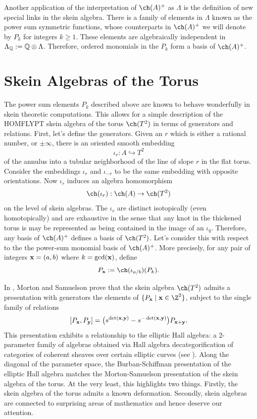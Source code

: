 Another application of the interpretation of $\ch(A)^+$ as $\Lambda$ is the definition of new special links in the skein algebra. There is a family of elements in $\Lambda$ known as the power sum symmetric functions, whose counterparts in $\ch(A)^+$ we will denote by $P_k$ for integers $k \geq 1$. These elements are algebraically independent in $\Lambda_{\mathbb{Q}} := \mathbb{Q} \otimes \Lambda$. Therefore, ordered monomials in the $P_k$ form a basis of $\ch(A)^+$.


\section{Skein Algebras of the Torus}

The power sum elements $P_k$ described above are known to behave wonderfully in skein theoretic computations. This allows for a simple description of the HOMFLYPT skein algebra of the torus $\ch(T^2)$ in terms of generators and relations. First, let's define the generators. Given an $r$ which is either a rational number, or $\pm \infty$, there is an oriented smooth embedding 
\[
\iota_{r}: A \hookrightarrow T^2
\]
of the annulus into a tubular neighborhood of the line of slope $r$ in the flat torus. Consider the embeddings $\iota_{r}$ and $\iota_{-r}$ to be the same embedding with opposite orientations. Now $\iota_r$ induces an algebra homomorphism
\[
\ch(\iota_r): \ch(A) \to \ch(T^2)
\]
on the level of skein algebras. The $\iota_r$ are distinct isotopically (even homotopically) and are exhaustive in the sense that any knot in the thickened torus is may be represented as being contained in the image of an $\iota_q$. Therefore, any basis of $\ch(A)^+$ defines a basis of $\ch(T^2)$. Let's consider this with respect to the the power-sum monomial basis of $\ch(A)^+$. More precisely, for any pair of integers ${\mathbf{x}} = (a, b)$ where $k = \gcd({\mathbf{x}})$, define 
\[
P_\xx := \ch(\iota_{a/b})(P_k).
\]

In \cite{MS17}, Morton and Samuelson prove that the skein algebra $\ch(T^2)$ admits a presentation with generators the elements of $\{ P_\xx \mid \xx \in \Z^2 \}$, subject to the single family of relations 
\[
[P_{\mathbf{x}}, P_{\mathbf{y}}] = \big( s^{\det({\mathbf{x}},{\mathbf{y}})} - s^{-\det({\mathbf{x}},{\mathbf{y}})} \big) P_{{\mathbf{x}} + {\mathbf{y}}}.
\]
This presentation exhibits a relationship to the elliptic Hall algebra: a 2-parameter family of algebras obtained via Hall algebra decategorification of categories of coherent sheaves over certain elliptic curves (see \cite{BS12}). Along the diagonal of the parameter space, the Burban-Schiffman presentation of the elliptic Hall algebra matches the Morton-Samuelson presentation of the skein algebra of the torus. At the very least, this highlights two things. Firstly, the skein algebra of the torus admits a known deformation. Secondly, skein algebras are connected to surprising areas of mathematics and hence deserve our attention. 

